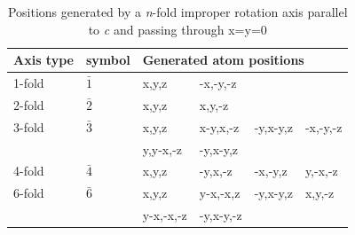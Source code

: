 \begin{table}
\centering
\caption{Positions generated by a \textit{n}-fold improper rotation axis parallel to \textit{c} and passing through x=y=0}
\label{tab:improper}

\begin{tabular}{|  p{} | p{} | l | l | l | l |}
\hline
Axis type & symbol & \multicolumn{4}{l|}{Generated atom positions} \\
\hline
1-fold & \vspace{0.01mm}$\bar{1}$ & x,y,z & -x,-y,-z  &   & \\
\hline
2-fold & \vspace{0.01mm}$\bar{2}$ & x,y,z & x,y,-z &   &  \\
\hline
3-fold & \vspace{0.01mm}$\bar{3}$ & x,y,z & x-y,x,-z & -y,x-y,z & -x,-y,-z \\
       &                          & y,y-x,-z & -y,x-y,z & & \\
\hline
4-fold & \vspace{0.01mm}$\bar{4}$ & x,y,z & -y,x,-z & -x,-y,z & y,-x,-z \\
\hline
6-fold & \vspace{0.01mm}$\bar{6}$ & x,y,z & y-x,-x,z & -y,x-y,z & x,y,-z \\
       &                          & y-x,-x,-z & -y,x-y,-z & & \\
\hline
\end{tabular}

\end{table}

